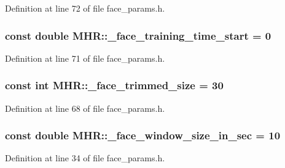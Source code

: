 Definition at line 72 of file face\+\_\+params.\+h.

\hypertarget{namespace_m_h_r_a4ad71fd0cc039551252ae1929fbbfea9}{
\subsubsection[{\+\_\+face\+\_\+training\+\_\+time\+\_\+start}]{\setlength{\rightskip}{0pt plus 5cm}const double M\+H\+R\+::\+\_\+face\+\_\+training\+\_\+time\+\_\+start = 0}}\label{namespace_m_h_r_a4ad71fd0cc039551252ae1929fbbfea9}


Definition at line 71 of file face\+\_\+params.\+h.

\hypertarget{namespace_m_h_r_ae64aacd3f078b0c1ecfefee56c27e3ce}{
\subsubsection[{\+\_\+face\+\_\+trimmed\+\_\+size}]{\setlength{\rightskip}{0pt plus 5cm}const int M\+H\+R\+::\+\_\+face\+\_\+trimmed\+\_\+size = 30}}\label{namespace_m_h_r_ae64aacd3f078b0c1ecfefee56c27e3ce}


Definition at line 68 of file face\+\_\+params.\+h.

\hypertarget{namespace_m_h_r_ada7fab40b0e865f6a26751fd550b5288}{
\subsubsection[{\+\_\+face\+\_\+window\+\_\+size\+\_\+in\+\_\+sec}]{\setlength{\rightskip}{0pt plus 5cm}const double M\+H\+R\+::\+\_\+face\+\_\+window\+\_\+size\+\_\+in\+\_\+sec = 10}}\label{namespace_m_h_r_ada7fab40b0e865f6a26751fd550b5288}


Definition at line 34 of file face\+\_\+params.\+h.

